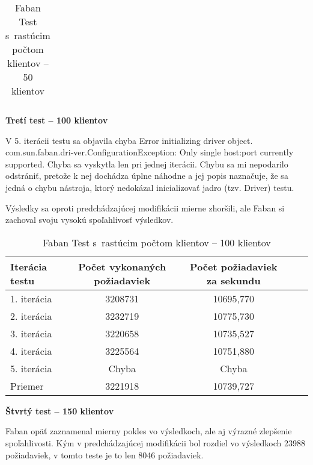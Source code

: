 \documentclass[12pt,oneside,final]{fithesis-utf8}
\begin{document}
\begin{itemize}
\begin{table}[H]
\begin{center}
\begin{tabular}{ | l | c | c | c | c |}
\end{tabular}
\end{center}
\caption{Faban Test s~rastúcim počtom klientov -- 50 klientov}
\end{table}


\textbf{Tretí test -- 100 klientov}

V 5. iterácii testu sa objavila chyba Error initializing driver object. com.sun.faban.dri-ver.ConfigurationException: Only single host:port currently supported. Chyba sa vyskytla len pri jednej iterácii.\hypertarget{label}{} Chybu sa mi nepodarilo odstrániť, pretože k nej dochádza úplne náhodne a jej popis naznačuje, že sa jedná o chybu nástroja, ktorý nedokázal inicializovať jadro (tzv. Driver) testu.
\par Výsledky sa oproti predchádzajúcej modifikácii mierne zhoršili, ale Faban si zachoval svoju vysokú spoľahlivosť výsledkov.

\begin{table}[H]
\begin{center}
\begin{tabular}{ | l | c | c | c | c |}
		\hline
		 \textbf{Iterácia testu} & \textbf{Počet vykonaných požiadaviek} & \textbf{Počet požiadaviek za sekundu} \\ \hline
		 1. iterácia & 3208731 & 10695,770 \\ \hline
		 2. iterácia & 3232719 & 10775,730 \\ \hline
		 3. iterácia & 3220658 & 10735,527 \\ \hline
		 4. iterácia & 3225564 & 10751,880 \\ \hline
		 5. iterácia & Chyba & Chyba \\ \hline
		 Priemer & 3221918 & 10739,727 \\ \hline
		 
\end{tabular}
\end{center}
\caption{Faban Test s~rastúcim počtom klientov -- 100 klientov}
\end{table}


\textbf{Štvrtý test -- 150 klientov}

Faban opäť zaznamenal mierny pokles vo výsledkoch, ale aj výrazné zlepšenie spoľahlivosti. Kým v predchádzajúcej modifikácii bol rozdiel vo výsledkoch 23988 požiadaviek, v tomto teste je to len 8046 požiadaviek.


\end{itemize}
\end{document}
